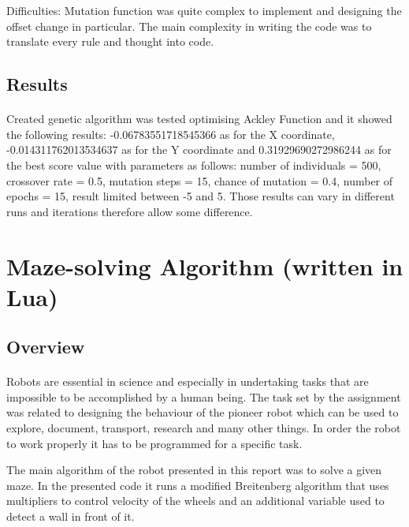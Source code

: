 \documentclass[12pt]{report}
\begin{document}
Difficulties: Mutation function was quite complex to implement and designing the offset change in particular.
The main complexity in writing the code was to translate every rule and thought into code.


\subsection*{Results}
\paragraph{}

Created genetic algorithm was tested optimising Ackley Function and it showed the following results: -0.06783551718545366 as for the X coordinate, -0.014311762013534637 as for the Y coordinate and 0.31929690272986244 as for the best score value with
parameters as follows: number of individuals = 500, crossover rate = 0.5, mutation steps = 15, chance of mutation = 0.4, number of epochs = 15, result limited between -5 and 5.
Those results can vary in different runs and iterations therefore allow some difference.

\clearpage

\section*{Maze-solving Algorithm (written in Lua)} %

\subsection*{Overview}
\paragraph{}

Robots are essential in science and especially in undertaking tasks that are impossible to be accomplished by a human being. The task set by the assignment was related to designing
the behaviour of the pioneer robot which can be used to explore, document, transport, research and many other things. In order the robot to work properly it has to be programmed for
a specific task. 

The main algorithm of the robot presented in this report was to solve a given maze. In the presented code it runs a modified Breitenberg algorithm that uses multipliers to control
velocity of the wheels and an additional variable used to detect a wall in front of it.
\end{document}
